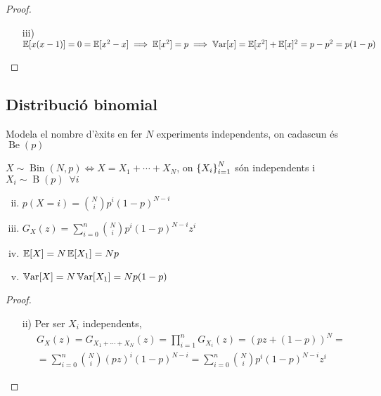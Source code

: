 \begin{proof}
    \begin{enumerate}[i)]
        \item[]
        \item[iii)] $\operatorname{\mathbb{E}}[x(x-1)] = 0 = \operatorname{\mathbb{E}}[x^2-x] \implies \operatorname{\mathbb{E}}[x^2] = p \implies \operatorname{\mathbb{V}ar}[x] = \operatorname{\mathbb{E}}[x^2] + \operatorname{\mathbb{E}}[x]^2
        = p-p^2 = p(1-p)$
    \end{enumerate}
\end{proof}

\subsection*{Distribució binomial}

Modela el nombre d'èxits en fer $N$ experiments independents, on cadascun és $\operatorname{Be}(p)$

\begin{defi}
    $X \sim \operatorname{Bin}(N,p) \iff X = X_1 + \cdots + X_N$,
    on $\left\{ X_i \right\}_{i=1}^{N}$ són independents i $X_i \sim \operatorname{B}(p) \enspace\forall i$
\end{defi}

\begin{prop}
    \begin{enumerate}[i)]
        \item[]
        \item $p(X=i) = \binom{N}{i}p^i(1-p)^{N-i}$
        \item $G_X(z) = \sum_{i=0}^{n} \binom{N}{i}p^i(1-p)^{N-i}z^i$
        \item $\operatorname{\mathbb{E}}[X] = N\operatorname{\mathbb{E}}[X_1] = Np$
        \item $\operatorname{\mathbb{V}ar}[X] = N\operatorname{\mathbb{V}ar}[X_1] = Np(1-p)$
    \end{enumerate}
\end{prop}

\begin{proof}
    \begin{enumerate}[i)]
        \item[]
        \item[ii)] Per ser $X_i$ independents,
        \begin{gather*}
        G_X(z) = G_{X_1 + \cdots + X_N}(z) = \prod_{i=1}^{n}G_{X_i}(z) = (pz+(1-p))^N = \\
        = \sum_{i=0}^n \binom{N}{i}(pz)^i(1-p)^{N-i} = \sum_{i=0}^{n} \binom{N}{i}p^i(1-p)^{N-i}z^i
        \end{gather*}
    \end{enumerate}
\end{proof}

